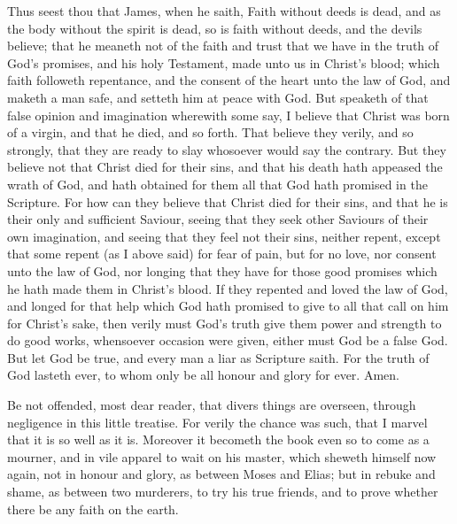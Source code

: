 Thus seest thou that James, when he saith, Faith without 
deeds is dead, and as the body without the spirit is dead,
so is faith without deeds, and the devils believe; that he
meaneth not of the faith and trust that we have in the
truth of God's promises, and his holy Testament, made
unto us in Christ's blood; which faith followeth repentance, 
and the consent of the heart unto the law of God, and 
maketh a man safe, and setteth him at peace with God. 
But speaketh of that false opinion and imagination wherewith
some say, I believe that Christ was born of a virgin, 
and that he died, and so forth. That believe they verily, 
and so strongly, that they are ready to slay whosoever 
would say the contrary. But they believe not that 
Christ died for their sins, and that his death hath appeased 
the wrath of God, and hath obtained for them all that 
God hath promised in the Scripture. For how can they 
believe that Christ died for their sins, and that he is their 
only and sufficient Saviour, seeing that they seek other 
Saviours of their own imagination, and seeing that they 
feel not their sins, neither repent, except that some repent 
(as I above said) for fear of pain, but for no love, nor consent 
unto the law of God, nor longing that they have for 
those good promises which he hath made them in Christ's 
blood. If they repented and loved the law of God, and 
longed for that help which God hath promised to give to 
all that call on him for Christ's sake, then verily must God's 
truth give them power and strength to do good works, whensoever
occasion were given, either must God be a false God. 
But let God be true, and every man a liar as Scripture 
saith. For the truth of God lasteth ever, to whom only 
be all honour and glory for ever. Amen. 

Be not offended, most dear reader, that divers things 
are overseen, through negligence in this little treatise. For 
verily the chance was such, that I marvel that it is so well 
as it is. Moreover it becometh the book even so to come 
as a mourner, and in vile apparel to wait on his master, 
which sheweth himself now again, not in honour and 
glory, as between Moses and Elias; but in rebuke and 
shame, as between two murderers, to try his true friends, 
and to prove whether there be any faith on the earth. 

